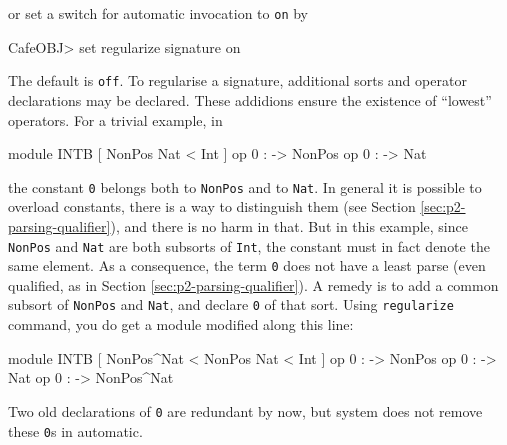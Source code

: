 \documentclass[a4paper]{memoir}
\begin{document}
or set a switch for automatic invocation to \verb|on| by
\begin{vvtm}
\begin{ccode}
  CafeOBJ> set regularize signature on
\end{ccode}
\end{vvtm}
The default is \verb|off|. To regularise a signature, additional sorts and
operator declarations may be declared. These addidions ensure the existence
of ``lowest'' operators. For a trivial example, in
\begin{vvtm}
\begin{ccode}
  module INTB {
    [ NonPos Nat < Int ]
    op 0 : -> NonPos
    op 0 : -> Nat
  }
\end{ccode}
\end{vvtm}
\label{exs:intb}
the constant \verb|0| belongs both to \verb|NonPos| and to \verb|Nat|.
In general it is possible to overload constants, there is a way to
distinguish them (see Section \ref{sec:p2-parsing-qualifier}), and
there is no harm in that. But in this example, since \verb|NonPos|
and \verb|Nat| are both subsorts of \verb|Int|, the constant must
in fact denote the same element. As a consequence, the term \verb|0|
does not have a least parse (even qualified,
as in Section \ref{sec:p2-parsing-qualifier}).
A remedy is to add a common subsort of \verb|NonPos| and \verb|Nat|,
and declare \verb|0| of that sort.
Using \verb|regularize| command, you do get a module modified along
this line:
\begin{vvtm}
\begin{ccode}
  module INTB {
    [ NonPos^Nat < NonPos Nat < Int ]
    op 0 : -> NonPos
    op 0 : -> Nat
    op 0 : -> NonPos^Nat
  }
\end{ccode}
\end{vvtm}
Two old declarations of \verb|0| are redundant by now, but system 
does not remove these \verb|0|s in automatic.

\end{document}
